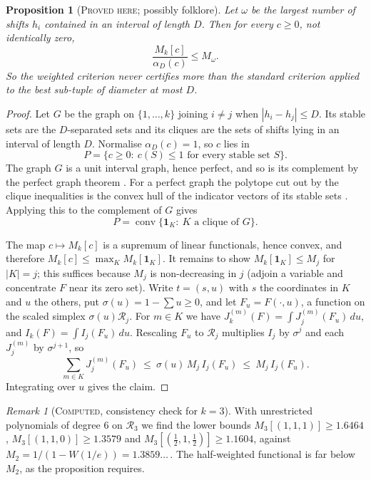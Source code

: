 \documentclass[11pt]{amsart}
\newtheorem{proposition}[theorem]{Proposition}
\theoremstyle{definition}
\theoremstyle{remark}
\newtheorem{remark}[theorem]{Remark}
\newcommand{\lbl}[1]{\textup{\textsc{#1}}}
\newcommand{\R}{\mathcal{R}}
\begin{document}
\begin{proposition}[\lbl{Proved here}; possibly folklore]\label{prop:rigid}
Let $\omega$ be the largest number of shifts $h_i$ contained in an interval of
length $D$. Then for every $c\ge0$, not identically zero,
\[
\frac{M_k[c]}{\alpha_D(c)}\le M_\omega .
\]
So the weighted criterion never certifies more than the standard criterion
applied to the best sub-tuple of diameter at most $D$.
\end{proposition}

\begin{proof}
Let $G$ be the graph on $\{1,\dots,k\}$ joining $i\ne j$ when
$|h_i-h_j|\le D$. Its stable sets are the $D$-separated sets and its cliques
are the sets of shifts lying in an interval of length $D$. Normalise
$\alpha_D(c)=1$, so $c$ lies in
\[P=\{c\ge0:\ c(S)\le1\text{ for every stable set }S\}.\] The graph $G$ is a
unit interval graph, hence perfect, and so is its complement by the perfect
graph theorem \cite{Lov72}. For a perfect graph the polytope cut out by the
clique inequalities is the convex hull of the indicator vectors of its stable
sets \cite{Chv75}. Applying this to the complement of $G$ gives
\[P=\operatorname{conv}\{\mathbf 1_K:\ K\text{ a clique of }G\}.\]

The map $c\mapsto M_k[c]$ is a supremum of linear functionals, hence convex,
and therefore $M_k[c]\le\max_KM_k[\mathbf 1_K]$. It remains to show
$M_k[\mathbf 1_K]\le M_{j}$ for $|K|=j$; this suffices because $M_j$ is
non-decreasing in $j$ (adjoin a variable and concentrate $F$ near its zero
set). Write $t=(s,u)$ with $s$ the coordinates in $K$ and $u$ the others, put
$\sigma(u)=1-\sum u\ge0$, and let $F_u=F(\cdot,u)$, a function on the scaled
simplex $\sigma(u)\R_j$. For $m\in K$ we have
$J_k^{(m)}(F)=\int J_j^{(m)}(F_u)\,du$, and $I_k(F)=\int I_j(F_u)\,du$.
Rescaling $F_u$ to $\R_j$ multiplies $I_j$ by $\sigma^{j}$ and each
$J_j^{(m)}$ by $\sigma^{j+1}$, so
\[
\sum_{m\in K}J_j^{(m)}(F_u)\ \le\ \sigma(u)\,M_j\,I_j(F_u)\ \le\ M_j\,I_j(F_u).
\]
Integrating over $u$ gives the claim.
\end{proof}

\begin{remark}[\lbl{Computed}, consistency check for $k=3$]
With unrestricted polynomials of degree $6$ on $\R_3$ we find the lower bounds
$M_3[(1,1,1)]\ge1.6464$, $M_3[(1,1,0)]\ge1.3579$ and
$M_3[(\tfrac12,1,\tfrac12)]\ge1.1604$, against
$M_2=1/(1-W(1/e))=1.3859\ldots$\,. The half-weighted functional is far below
$M_2$, as the proposition requires.
\end{remark}
\end{document}
